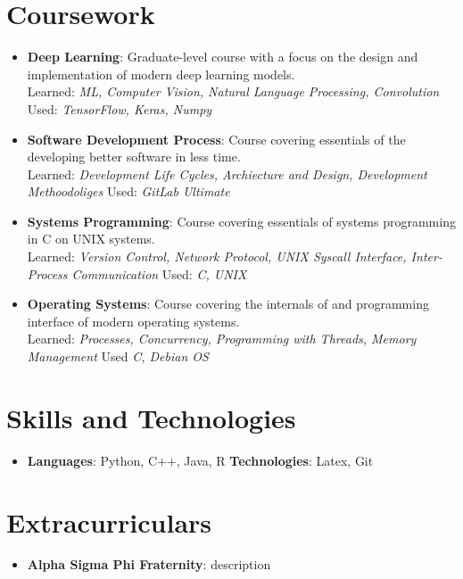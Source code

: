 \documentclass[letterpaper,11pt]{article}
\newcommand{\resumeItem}[2]{
  \item\small{
    \textbf{#1}{: #2 \vspace{-2pt}}
  }
}
\newcommand{\resumeSubItem}[2]{\resumeItem{#1}{#2}\vspace{-4pt}}
\begin{document}
\section{Coursework}
    \begin{itemize}[leftmargin=*]
        \resumeSubItem{Deep Learning}
          {Graduate-level course with a focus on the design and implementation of modern deep learning models. \\ Learned: \emph{ML, Computer Vision, Natural Language Processing, Convolution} \hfill Used: \emph{TensorFlow, Keras, Numpy}}
        \resumeSubItem{Software Development Process} 
          {Course covering essentials of the developing better software in less time. \\ Learned: \emph{Development Life Cycles, Archiecture and Design, Development Methoodoliges} \hfill Used: \emph{GitLab Ultimate}}
        \resumeSubItem{Systems Programming}
          {Course covering essentials of systems programming in C on UNIX systems. \\ Learned: \emph{Version Control, Network Protocol, UNIX Syscall Interface, Inter-Process Communication} \hfill Used: \emph{C, UNIX}}
        \resumeSubItem{Operating Systems}
        {Course covering the internals of and programming interface of modern operating systems. \\ Learned: \emph{Processes, Concurrency, Programming with Threads, Memory Management} \hfill Used \emph{C, Debian OS}}
    \end{itemize}


\section{Skills and Technologies}
    \begin{itemize}[leftmargin=*]
        \item{
             \textbf{Languages}{: Python, C++, Java, R}
             \hfill
             \textbf{Technologies}{: Latex, Git}
        }
    \end{itemize}


\section{Extracurriculars}
    \begin{itemize}[leftmargin=*]
        \resumeSubItem{Alpha Sigma Phi Fraternity}
        {description}
    \end{itemize}
\end{document}
